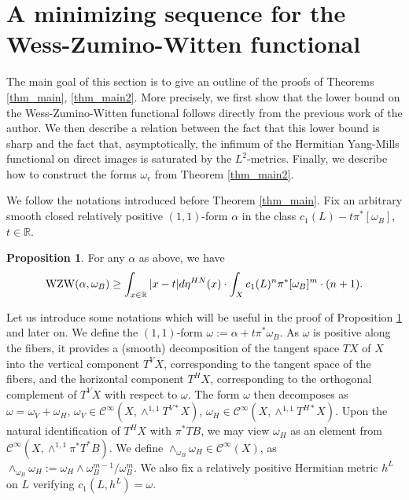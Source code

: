 \documentclass[12pt]{article}
\numberwithin{equation}{section}
\theoremstyle{theorem}
\theoremstyle{definition}
\newtheorem{prop}[thm]{Proposition}
\theoremstyle{remark}
\newcommand{\real}{\mathbb{R}}
\newcommand{\ccal}{\mathscr{C}}
\begin{document}
	\section{A minimizing sequence for the Wess-Zumino-Witten functional}\label{sect_min_seq}
	The main goal of this section is to give an outline of the proofs of Theorems \ref{thm_main}, \ref{thm_main2}.
	More precisely, we first show that the lower bound on the Wess-Zumino-Witten functional follows directly from the previous work \cite{FinHNII} of the author.
	We then describe a relation between the fact that this lower bound is sharp and the fact that, asymptotically, the infimum of the Hermitian Yang-Mills functional on direct images is saturated by the $L^2$-metrics.
	Finally, we describe how to construct the forms $\omega_{\epsilon}$ from Theorem \ref{thm_main2}.
	\par 
	We follow the notations introduced before Theorem \ref{thm_main}.
	Fix an arbitrary smooth closed relatively positive $(1, 1)$-form $\alpha$ in the class $c_1(L) - t \pi^* [\omega_B]$, $t \in \real$. 
	\begin{prop}\label{prop_low_bnd}
		For any $\alpha$ as above, we have
		\begin{equation}\label{eq_low_bnd}
			{\rm{WZW}}(\alpha, \omega_B) \geq \int_{x \in \real} |x - t| d \eta^{HN}(x)
			\cdot
			\int_X c_1(L)^n \pi^* [\omega_B]^m
			\cdot
			(n + 1).
		\end{equation}
	\end{prop}
	Let us introduce some notations which will be useful in the proof of Proposition \ref{prop_low_bnd} and later on.
	We define the $(1, 1)$-form $\omega := \alpha + t \pi^* \omega_B$.
	As $\omega$ is positive along the fibers, it provides a (smooth) decomposition of the tangent space $TX$ of $X$ into the vertical component $T^V X$, corresponding to the tangent space of the fibers, and the horizontal component $T^H X$, corresponding to the orthogonal complement of $T^V X$ with respect to $\omega$.
	The form $\omega$ then decomposes as $\omega = \omega_V + \omega_H$, $\omega_V \in \ccal^{\infty}(X, \wedge^{1, 1} T^{V*} X)$, $\omega_H \in \ccal^{\infty}(X, \wedge^{1, 1} T^{H*} X)$. 
	Upon the natural identification of $T^H X$ with $\pi^* TB$, we may view $\omega_H$ as an element from $\ccal^{\infty}(X, \wedge^{1, 1} \pi^* T^* B)$.
	We define $\wedge_{\omega_B} \omega_H \in \ccal^{\infty}(X)$, as $\wedge_{\omega_B} \omega_H := \omega_H \wedge \omega_B^{m - 1} / \omega_B^m$.
	We also fix a relatively positive Hermitian metric $h^L$ on $L$ verifying $c_1(L, h^L) = \omega$.
\end{document}
